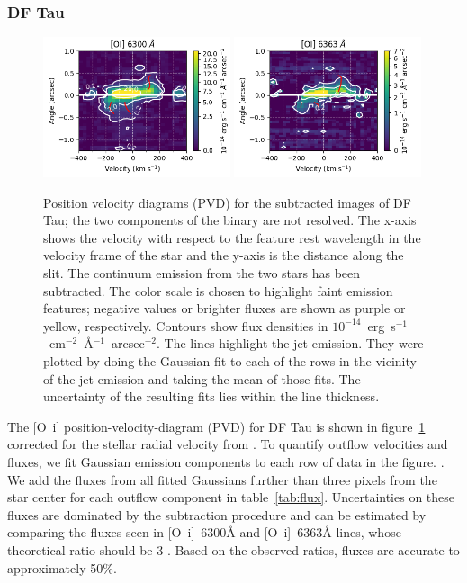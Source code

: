 \documentclass[twocolumn,trackchanges]{aastex63}
\begin{document}
\subsubsection{DF Tau}
\begin{figure}
\begin{center}
\includegraphics[width=0.49\textwidth]{DF_6300.png}
\includegraphics[width=0.49\textwidth]{DF_6363.png}
\caption{Position velocity diagrams (PVD) for the subtracted images
of DF Tau; the two components of the binary are not resolved. The x-axis
shows the velocity with respect to the feature rest wavelength in the
velocity frame of the star and the y-axis is the distance along the slit. The
continuum emission from the two stars has been subtracted. The color scale is chosen to highlight faint emission features; negative values or brighter fluxes are shown as purple or yellow, respectively. Contours show flux densities in $10^{-14}$~erg~s$^{-1}$~cm$^{-2}$~\AA{}$^{-1}$~arcsec$^{-2}$.
The  lines highlight the jet emission. They were plotted by doing the Gaussian fit to each of the rows in the vicinity of the jet emission and taking the mean of those fits. The uncertainty of the resulting fits lies within the line thickness.
\label{fig:DFTau}}
\end{center}
\end{figure}
The [O~{\sc i}] position-velocity-diagram (PVD) for DF Tau is shown in figure~\ref{fig:DFTau}
corrected for the stellar radial velocity from \citet{2006AstL...32..759G}.
To quantify outflow velocities and fluxes, we fit Gaussian emission components
to each row of data in the figure. . We add the fluxes from all fitted Gaussians further than three pixels from the star center for each outflow component
in table~\ref{tab:flux}. Uncertainties on these fluxes are dominated by the
subtraction procedure and can be estimated by comparing the fluxes seen in
[O~{\sc i}]~6300\AA{} and [O~{\sc i}]~6363\AA{} lines, whose theoretical ratio
should be 3 \citep{2000MNRAS.312..813S}. Based on the observed ratios, fluxes
are accurate to approximately 50\%.
\end{document}

